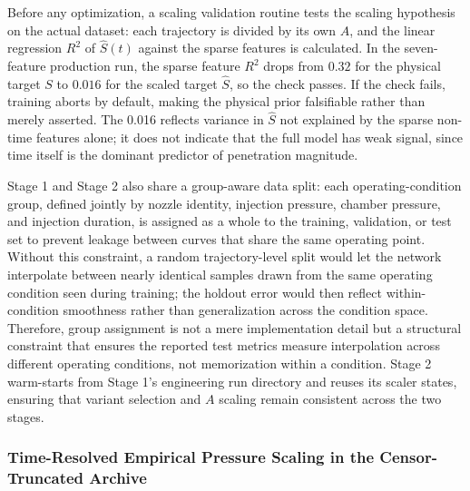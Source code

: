 Before any optimization, a scaling validation routine tests the scaling hypothesis on the actual dataset: each trajectory is divided by its own $A$, and the linear regression $R^2$ of $\hat{S}(t)$ against the sparse features is calculated. In the seven-feature production run, the sparse feature $R^2$ drops from $0.32$ for the physical target $S$ to $0.016$ for the scaled target $\hat{S}$, so the check passes. If the check fails, training aborts by default, making the physical prior falsifiable rather than merely asserted. The 0.016 reflects variance in $\hat{S}$ not explained by the sparse non-time features alone; it does not indicate that the full model has weak signal, since time itself is the dominant predictor of penetration magnitude.

Stage 1 and Stage 2 also share a group-aware data split: each operating-condition group, defined jointly by nozzle identity, injection pressure, chamber pressure, and injection duration, is assigned as a whole to the training, validation, or test set to prevent leakage between curves that share the same operating point. Without this constraint, a random trajectory-level split would let the network interpolate between nearly identical samples drawn from the same operating condition seen during training; the holdout error would then reflect within-condition smoothness rather than generalization across the condition space. Therefore, group assignment is not a mere implementation detail but a structural constraint that ensures the reported test metrics measure interpolation across different operating conditions, not memorization within a condition. Stage 2 warm-starts from Stage 1's engineering run directory and reuses its scaler states, ensuring that variant selection and $A$ scaling remain consistent across the two stages.

\subsubsection{Time-Resolved Empirical Pressure Scaling in the Censor-Truncated Archive}
\label{sec:pointlevel-scaling-verification}

